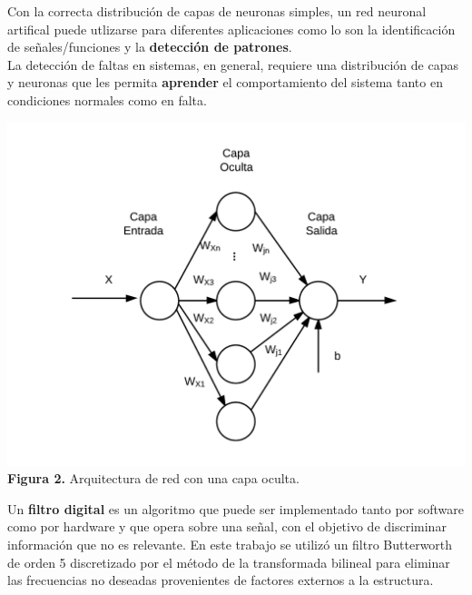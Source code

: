 \documentclass[a0paper,portrait]{baposter}
\begin{document}
\begin{poster}
{Con la correcta distribución de capas de neuronas simples, un red neuronal artifical puede utlizarse para diferentes aplicaciones como lo son la identificación de señales/funciones y la \textbf{detección de patrones}. \\

La detección de faltas en sistemas, en general, requiere una distribución de capas y neuronas que les permita \textbf{aprender} el comportamiento del sistema tanto en condiciones normales como en falta. 
\begin{center}
\includegraphics[width=\linewidth]{ann}
\\ {\footnotesize \textbf{Figura 2.} Arquitectura de red con una capa oculta.}
\end{center}

Un \textbf{filtro digital} es un algoritmo  que puede ser implementado tanto por software como por hardware y que opera sobre una señal, con el objetivo de discriminar información que no es relevante.
En este trabajo se utilizó un filtro Butterworth de orden 5 discretizado por el método de la transformada bilineal para eliminar las frecuencias no deseadas provenientes de factores externos a la estructura.



}


\end{poster}
\end{document}
